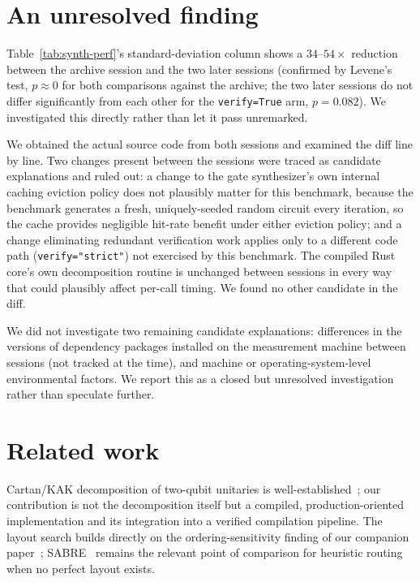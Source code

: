 \documentclass[11pt]{article}
\begin{document}
\section{An unresolved finding}
\label{sec:variance}

Table~\ref{tab:synth-perf}'s standard-deviation column shows a
$34$--$54\times$ reduction between the archive session and the two
later sessions (confirmed by Levene's test, $p \approx 0$ for both
comparisons against the archive; the two later sessions do not differ
significantly from each other for the \texttt{verify=True} arm,
$p=0.082$). We investigated this directly rather than let it pass
unremarked.

We obtained the actual source code from both sessions and examined the
diff line by line. Two changes present between the sessions were
traced as candidate explanations and ruled out: a change to the gate
synthesizer's own internal caching eviction policy does not
plausibly matter for this benchmark, because the benchmark generates a
fresh, uniquely-seeded random circuit every iteration, so the cache
provides negligible hit-rate benefit under either eviction policy; and
a change eliminating redundant verification work applies only to a
different code path (\texttt{verify="strict"}) not exercised by this
benchmark. The compiled Rust core's own decomposition routine is
unchanged between sessions in every way that could plausibly affect
per-call timing. We found no other candidate in the diff.

We did not investigate two remaining candidate explanations: differences
in the versions of dependency packages installed on the measurement
machine between sessions (not tracked at the time), and machine or
operating-system-level environmental factors. We report this as a
closed but unresolved investigation rather than speculate further.

\section{Related work}

Cartan/KAK decomposition of two-qubit unitaries is
well-established~\cite{kak1,kak2}; our contribution is not the
decomposition itself but a compiled, production-oriented
implementation and its integration into a verified compilation
pipeline. The layout search builds directly on the ordering-sensitivity
finding of our companion paper~\cite{vf2cliff}; SABRE~\cite{sabre}
remains the relevant point of comparison for heuristic routing when no
perfect layout exists.
\end{document}
